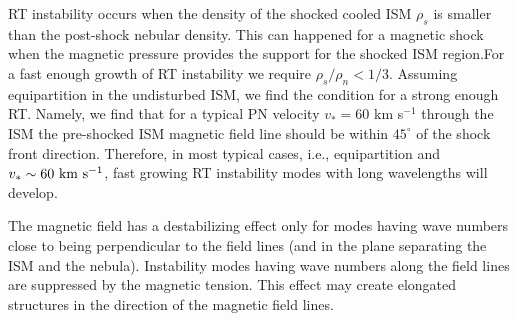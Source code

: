 RT instability occurs when the density of the shocked cooled ISM
$\rho_s$ is smaller
than the post-shock nebular density.
This can happened for a magnetic shock when the magnetic pressure 
provides the support for the shocked ISM region.For a fast enough growth of
RT instability we require $\rho_s/\rho_n < 1/3$.
Assuming equipartition in the
undisturbed ISM, we find the condition for a strong enough RT.
Namely, we find that for a typical PN velocity $v_\ast=60$ km s$^{-1}$ 
through the ISM the pre-shocked ISM
magnetic field line should be within $45^\circ$ of the shock front direction. 
Therefore, in most typical cases, i.e., equipartition and
$v_\ast \sim 60 ~\rm{km} ~\rm{s}^{-1}$, fast growing RT instability modes with long
wavelengths will develop.

The magnetic field has a destabilizing effect only for modes
having wave numbers close to being perpendicular to the field lines
(and in the plane separating the ISM and the nebula).
Instability modes having wave numbers along the field lines are
suppressed by the magnetic tension.
This effect may create elongated structures in the direction of the
magnetic field lines.

